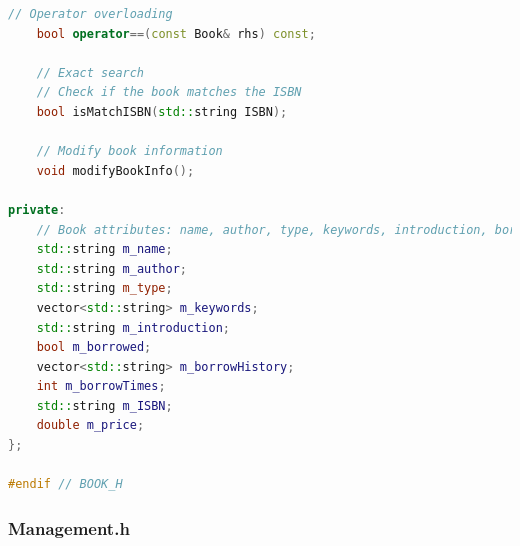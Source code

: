 \documentclass[12pt,twoside]{ctexart}
\begin{document}
\begin{lstlisting}[language=C++]
    // Operator overloading
    bool operator==(const Book& rhs) const;

    // Exact search
    // Check if the book matches the ISBN
    bool isMatchISBN(std::string ISBN);

    // Modify book information
    void modifyBookInfo();

private:
    // Book attributes: name, author, type, keywords, introduction, borrow status, borrow history, borrow times, ISBN, price
    std::string m_name;
    std::string m_author;
    std::string m_type;
    vector<std::string> m_keywords;
    std::string m_introduction;
    bool m_borrowed;
    vector<std::string> m_borrowHistory;
    int m_borrowTimes;
    std::string m_ISBN;
    double m_price;
};

#endif // BOOK_H
\end{lstlisting}

\newpage
\subsubsection{Management.h}
\end{document}
